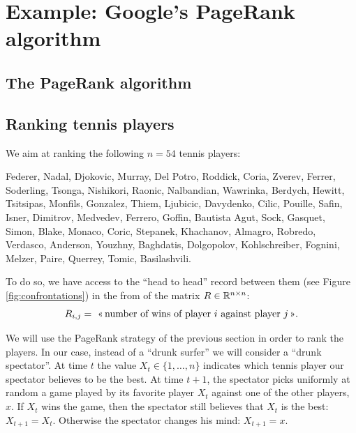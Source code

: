 \documentclass[11pt,nocut]{article}
\begin{document}
\section{Example: Google's PageRank algorithm}

\subsection{The PageRank algorithm}

\subsection{Ranking tennis players}
We aim at ranking the following $n=54$ tennis players:
\begin{center}
Federer, Nadal, Djokovic, Murray, Del Potro, Roddick, Coria, Zverev, Ferrer, Soderling, Tsonga, Nishikori, Raonic, Nalbandian, Wawrinka, Berdych, Hewitt, Tsitsipas, Monfils, Gonzalez, Thiem, Ljubicic, Davydenko, Cilic, Pouille, Safin, Isner, Dimitrov, Medvedev, Ferrero, Goffin, Bautista Agut, Sock, Gasquet, Simon, Blake, Monaco, Coric, Stepanek, Khachanov, Almagro, Robredo, Verdasco, Anderson, Youzhny, Baghdatis, Dolgopolov, Kohlschreiber, Fognini, Melzer, Paire, Querrey, Tomic, Basilashvili.
\end{center}

To do so, we have access to the ``head to head'' record between them (see Figure \ref{fig:confrontations}) in the from of the matrix $R \in \mathbb{R}^{n \times n}$:
\begin{equation}\label{eq:def_R}
R_{i,j} = \ \text{<<\,number of wins of player $i$ against player $j$\,>>}.
\end{equation}

We will use the PageRank strategy of the previous section in order to rank the players. In our case, instead of a ``drunk surfer'' we will consider a ``drunk spectator''.
At time $t$ the value $X_t \in \{1, \dots, n\}$ indicates which tennis player our spectator believes to be the best. At time $t+1$, the spectator picks uniformly at random a game played by its favorite player $X_t$ against one of the other players, $x$.
If $X_t$ wins the game, then the spectator still believes that $X_t$ is the best: $X_{t+1} = X_t$. Otherwise the spectator changes his mind: $X_{t+1} = x$.
\end{document}
